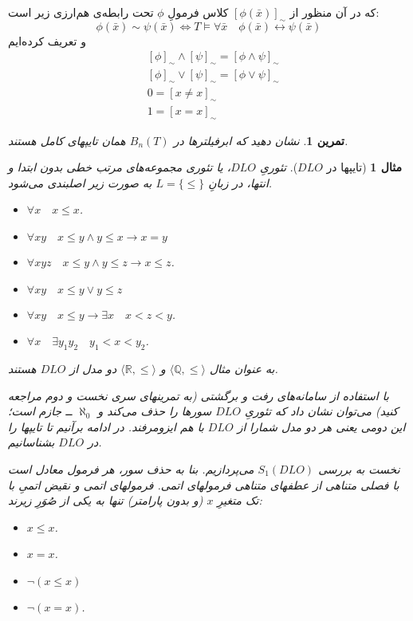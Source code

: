 \documentclass[12pt,a4paper]{report}
\theoremstyle{colorhead}
\newtheorem{tam}[thm]{تمرین}
\newtheorem{mesal}[thm]{مثال}
\begin{document}
که در آن منظور از
$[\phi(\bar{x})]_\sim$
کلاس فرمولِ
$\phi$
تحت رابطه‌ی هم‌ارزی زیر است:
\[
\phi(\bar{x})\sim \psi(\bar{x})\Leftrightarrow T\models \forall \bar{x}
\quad \phi(\bar{x})\leftrightarrow \psi(\bar{x})
\]
و تعریف کرده‌ایم
\begin{align*}
& [\phi]_\sim \wedge [\psi]_\sim=[\phi\wedge\psi]_\sim\\
& [\phi]_\sim \vee [\psi]_\sim=[\phi\vee\psi]_\sim\\
& 0=[x\not=x]_\sim\\
& 1=[x=x]_\sim 
\end{align*}
\begin{tam}
نشان دهید که ابرفیلترها
در
$B_n(T)$
همان تایپهای کامل هستند.
\end{tam}
\begin{mesal}[تایپها در
$DLO$]
تئوریِ
$DLO$،
یا تئوری مجموعه‌های مرتب خطی بدون ابتدا و انتها، در زبانِ
$L=\{\leq\}$
به صورت زیر اصلبندی می‌شود.
\begin{itemize}
\item 
$\forall x \quad x\leq x$.
\item 
$\forall xy \quad x\leq y \wedge y\leq x\to x=y$
\item 
$\forall xyz \quad x\leq y\wedge y\leq z\to x\leq z$.
\item
$\forall xy \quad x\leq y \vee y\leq z$
\item 
$\forall xy\quad x\leq y\to \exists x  \quad x<z< y$.
\item 
$\forall x\quad \exists y_1y_2 \quad y_1<x<y_2$.
\end{itemize}
به عنوان مثال
$\langle \mathbb{Q},\leq\rangle$
و
$\langle \mathbb{R},\leq\rangle$
دو مدل از 
$DLO$
هستند. 
\par 
با استفاده از سامانه‌های رفت و برگشتی (به تمرینهای سری نخست و دوم مراجعه کنید)
می‌توان نشان داد که تئوریِ
$DLO$
سورها را حذف می‌کند و
$\aleph_0$
ــ 
جازم است؛ این دومی یعنی  هر دو مدل شمارا از
$DLO$
با هم ایزومرفند. در ادامه برآنیم تا تایپها را در
$DLO$
بشناسانیم.
\par 
نخست به بررسی
$S_1(DLO)$
می‌پردازیم. بنا به حذف سور، هر فرمول معادل است با
فصلی متناهی از عطفهای متناهی فرمولهای اتمی. فرمولهای اتمی و نقیض اتمیِ
با تک متغیرِ
$x$
(و بدون پارامتر)
تنها به یکی از صُوَرِ زیرند:
\begin{itemize}
\item $x\leq x$.
\item $x=x$.
\item $\neg (x\leq x)$
\item $\neg (x=x)$.
\end{itemize}

\end{mesal}
\end{document}
